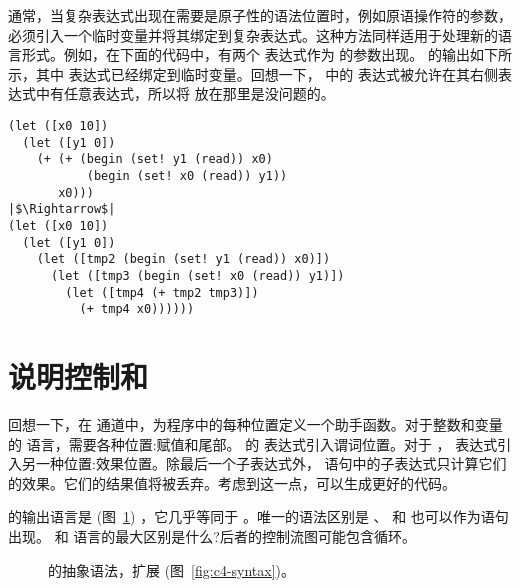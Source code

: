 \documentclass[11pt]{book}
\newcommand{\gray}[1]{{\color{gray} #1}}
\begin{document}
通常，当复杂表达式出现在需要是原子性的语法位置时，例如原语操作符的参数，必须引入一个临时变量并将其绑定到复杂表达式。这种方法同样适用于处理新的语言形式。例如，在下面的代码中，有两个
 表达式作为 \code{+} 的参数出现。  的输出如下所示，其中 
表达式已经绑定到临时变量。回想一下， \LangLoopANF{} 中的
 表达式被允许在其右侧表达式中有任意表达式，所以将  放在那里是没问题的。

\begin{lstlisting}
(let ([x0 10])
  (let ([y1 0])
    (+ (+ (begin (set! y1 (read)) x0)
           (begin (set! x0 (read)) y1))
       x0)))
|$\Rightarrow$|
(let ([x0 10])
  (let ([y1 0])
    (let ([tmp2 (begin (set! y1 (read)) x0)])
      (let ([tmp3 (begin (set! x0 (read)) y1)])
        (let ([tmp4 (+ tmp2 tmp3)])
          (+ tmp4 x0))))))
\end{lstlisting}

\section{说明控制和 \LangCLoop{}}
\label{sec:explicate-loop}

回想一下，在  通道中，为程序中的每种位置定义一个助手函数。对于整数和变量的 \LangVar{}
语言，需要各种位置:赋值和尾部。\LangIf{} 的  表达式引入谓词位置。对于 \LangLoop{} ，  表达式引入另一种位置:效果位置。除最后一个子表达式外，  语句中的子表达式只计算它们的效果。它们的结果值将被丢弃。考虑到这一点，可以生成更好的代码。

  的输出语言是 \LangCLoop{}(图~\ref{fig:c7-syntax}) ，它几乎等同于
\LangCLam{} 。唯一的语法区别是  、
 和  也可以作为语句出现。
 \LangCLam{} 和 \LangCLoop{} 语言的最大区别是什么?后者的控制流图可能包含循环。


\begin{figure}[tp]
\fbox{
\begin{minipage}{0.96\textwidth}
\small
\[
\begin{array}{lcl}
\Stmt &::=& \gray{ \ASSIGN{\VAR{\Var}}{\Exp} 
       \mid \LP\key{Collect} \,\itm{int}\RP } \\
     &\mid& \CALL{\Atm}{\LP\Atm\ldots\RP} \mid \READ{}\\
     &\mid& \LP\key{Prim}~\key{'vector-set!}\,\LP\key{list}\,\Atm\,\INT{\Int}\,\Atm\RP\RP \\
\Def &::=& \DEF{\itm{label}}{\LP\LS\Var\key{:}\Type\RS\ldots\RP}{\Type}{\itm{info}}{\LP\LP\itm{label}\,\key{.}\,\Tail\RP\ldots\RP}\\
\LangCLoop{} & ::= & \PROGRAMDEFS{\itm{info}}{\LP\Def\ldots\RP} 
\end{array}
\]
\end{minipage}
}
\caption{ \LangCLoop{} 的抽象语法，扩展 \LangCLam{} (图~\ref{fig:c4-syntax})。}
\label{fig:c7-syntax}
\end{figure}
\end{document}

